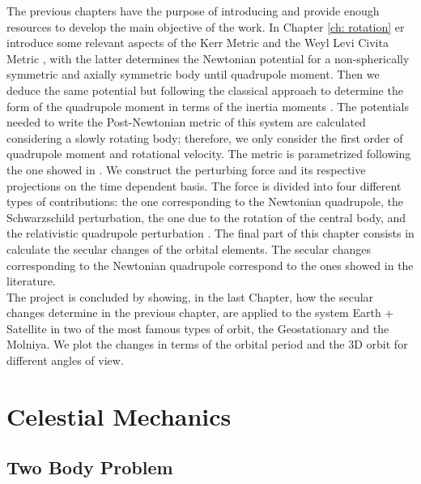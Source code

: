 The previous chapters have the purpose of introducing and provide enough resources to develop the main objective of the work. In Chapter \ref{ch: rotation} er introduce some relevant aspects of the Kerr Metric \cite{Bambi, Frolov, Raine} and the Weyl Levi Civita Metric \cite{johnandcoulter}, with the latter determines the Newtonian potential for a non-spherically symmetric and axially symmetric body until quadrupole moment. Then we deduce the same potential but following the classical approach to determine the form of the quadrupole moment in terms of the inertia moments \cite{Goldstain, GravityPoisson}. The potentials needed to write the Post-Newtonian metric of this system are calculated considering a slowly rotating body; therefore, we only consider the first order of quadrupole moment and rotational velocity. The metric is parametrized following the one showed in \cite{Brumberg}. We construct the perturbing force and its respective projections on the time dependent basis. The force is divided into four different types of contributions: the one corresponding to the Newtonian quadrupole, the Schwarzschild perturbation, the one due to the rotation of the central body, and the relativistic quadrupole perturbation \cite{Brumberg}. The final part of this chapter consists in calculate the secular changes of the orbital elements. The secular changes corresponding to the Newtonian quadrupole correspond to the ones showed in the literature.\\

The project is concluded by showing, in the last Chapter, how  the secular changes determine in the previous chapter, are applied to the system Earth + Satellite in two of the most famous types of orbit, the Geostationary and the Molniya. We plot the changes in terms of the orbital period and the 3D orbit for different angles of view.





\chapter{Celestial Mechanics}\label{ch: celestial mechanics}

\section{Two Body Problem}


